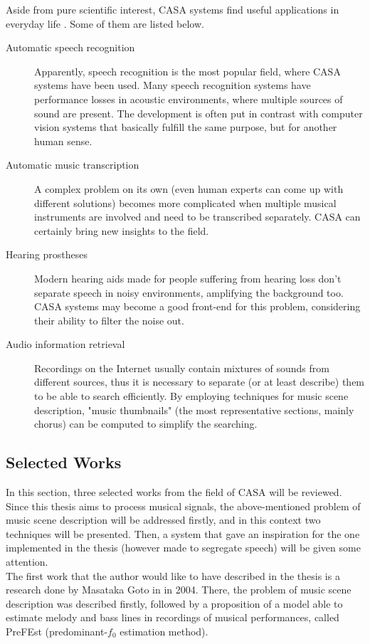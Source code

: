 Aside from pure scientific interest, CASA systems find useful applications in everyday life \cite{Wang2006}. Some of them are listed below.

\begin{description}
	\item[Automatic speech recognition] Apparently, speech recognition is the most popular field, where CASA systems have been used. Many speech recognition systems have performance losses in acoustic environments, where multiple sources of sound are present. The development is often put in contrast with computer vision systems that basically fulfill the same purpose, but for another human sense.
	\item[Automatic music transcription] A complex problem on its own (even human experts can come up with different solutions) becomes more complicated when multiple musical instruments are involved and need to be transcribed separately. CASA can certainly bring new insights to the field.
	\item[Hearing prostheses] Modern hearing aids made for people suffering from hearing loss don't separate speech in noisy environments, amplifying the background too. CASA systems may become a good front-end for this problem, considering their ability to filter the noise out.
	\item[Audio information retrieval] Recordings on the Internet usually contain mixtures of sounds from different sources, thus it is necessary to separate (or at least describe) them to be able to search efficiently. By employing techniques for music scene description, "music thumbnails" (the most representative sections, mainly chorus) can be computed to simplify the searching.
\end{description}

\subsection{Selected Works}

In this section, three selected works from the field of CASA will be reviewed. Since this thesis aims to process musical signals, the above-mentioned problem of music scene description will be addressed firstly, and in this context two techniques will be presented. Then, a system that gave an inspiration for the one implemented in the thesis (however made to segregate speech) will be given some attention.\\

The first work that the author would like to have described in the thesis is a research done by Masataka Goto in \cite{Goto2004} in 2004. There, the problem of music scene description was described firstly, followed by a proposition of a model able to estimate melody and bass lines in recordings of musical performances, called PreFEst (predominant-$f_0$ estimation method).\\

